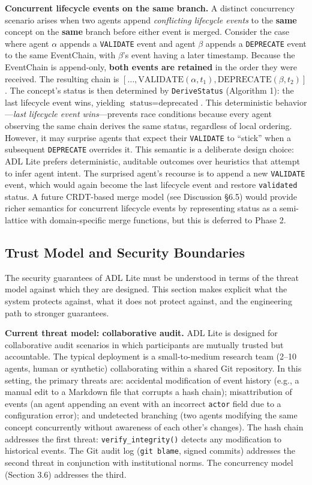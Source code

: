 \textbf{Concurrent lifecycle events on the same branch.} A distinct concurrency scenario arises when two agents append \emph{conflicting lifecycle events} to the \textbf{same} concept on the \textbf{same} branch before either event is merged. Consider the case where agent \(\alpha\) appends a \texttt{VALIDATE} event and agent \(\beta\) appends a \texttt{DEPRECATE} event to the same EventChain, with \(\beta\)'s event having a later timestamp. Because the EventChain is append-only, \textbf{both events are retained} in the order they were received. The resulting chain is \([\ldots, \text{VALIDATE}(\alpha, t_1), \text{DEPRECATE}(\beta, t_2)]\). The concept's status is then determined by \texttt{DeriveStatus} (Algorithm 1): the last lifecycle event wins, yielding \(\text{status} = \text{deprecated}\). This deterministic behavior---\emph{last lifecycle event wins}---prevents race conditions because every agent observing the same chain derives the same status, regardless of local ordering. However, it may surprise agents that expect their \texttt{VALIDATE} to ``stick'' when a subsequent \texttt{DEPRECATE} overrides it. This semantic is a deliberate design choice: ADL Lite prefers deterministic, auditable outcomes over heuristics that attempt to infer agent intent. The surprised agent's recourse is to append a new \texttt{VALIDATE} event, which would again become the last lifecycle event and restore \texttt{validated} status. A future CRDT-based merge model (see Discussion §6.5) would provide richer semantics for concurrent lifecycle events by representing status as a semi-lattice with domain-specific merge functions, but this is deferred to Phase 2.

\subsection{Trust Model and Security Boundaries}\label{trust-model-and-security-boundaries}

The security guarantees of ADL Lite must be understood in terms of the threat model against which they are designed. This section makes explicit what the system protects against, what it does not protect against, and the engineering path to stronger guarantees.

\textbf{Current threat model: collaborative audit.} ADL Lite is designed for collaborative audit scenarios in which participants are mutually trusted but accountable. The typical deployment is a small-to-medium research team (2--10 agents, human or synthetic) collaborating within a shared Git repository. In this setting, the primary threats are: accidental modification of event history (e.g., a manual edit to a Markdown file that corrupts a hash chain); misattribution of events (an agent appending an event with an incorrect \texttt{actor} field due to a configuration error); and undetected branching (two agents modifying the same concept concurrently without awareness of each other's changes). The hash chain addresses the first threat: \texttt{verify\_integrity()} detects any modification to historical events. The Git audit log (\texttt{git\ blame}, signed commits) addresses the second threat in conjunction with institutional norms. The concurrency model (Section 3.6) addresses the third.

